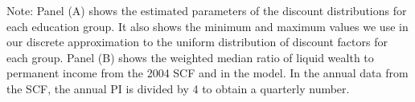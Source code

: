 \documentclass[\latexroot/\projectname]{subfiles}
\begin{document}
\begin{table}[tb] 
  \caption{\pregenmark Estimated discount factor distributions and estimation targets}
  \whenintegrated{\label{tab:estimBetas}} %
  \centering


  \noindent\parbox{\textwidth}{
    \medskip
    \footnotesize Note: Panel (A) shows the estimated parameters of the discount distributions for each education group. It also shows the minimum and maximum values we use in our discrete approximation to the uniform distribution of discount factors for each group. Panel (B) shows the weighted median ratio of liquid wealth to permanent income from the 2004 SCF and in the model. In the annual data from the SCF, the annual PI is divided by 4 to obtain a quarterly number.
  }

\end{table}

\smartbib
\end{document}
